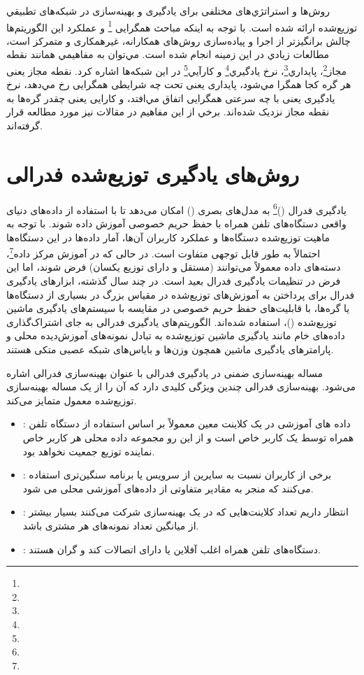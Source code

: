 روش‌ها و استراتژي‌های مختلفی برای یادگیری و بهینه‌سازی در شبکه‌های تطبيقي توزیع‌شده ارائه‌ شده است. با توجه به اينكه مباحث همگرایی \footnote{}  و عملکرد این الگوریتم‌ها چالش برانگیزتر از اجرا و پیاده‌سازی روش‌های همکارانه، غیرهمکاری و متمرکز است، مطالعات زيادي در اين زمينه انجام شده است. مي‌توان به مفاهيمي همانند نقطه مجاز\footnote{}، پايداري\footnote{}، نرخ يادگيري\footnote{} و كارآيي\footnote{}   در اين شبكه‌ها اشاره كرد.‌ نقطه مجاز یعنی هر گره کجا همگرا مي‌شود، پایداری یعنی تحت چه شرایطی همگرایی رخ مي‌دهد، نرخ یادگیری یعنی با چه سرعتی همگرایی اتفاق مي‌افتد، و کارایی یعنی چقدر گره‌ها به نقطه مجاز نزدیک شده‌اند. برخي از اين مفاهيم در مقالات \cite{Kha2012, Haj2018, Sayed2014} نيز مورد مطالعه قرار گرفته‌اند. 

\section{روش‌های یادگیری توزیع‌شده فدرالی}
یادگیری فدرال ()\footnote{} به مدل‌های بصری () امکان می‌دهد تا با استفاده از داده‌های دنیای واقعی دستگاه‌های تلفن همراه با حفظ حریم خصوصی آموزش داده شوند. با توجه به ماهیت توزیع‌شده دستگاه‌ها و عملکرد کاربران آن‌ها، آمار داده‌ها در این دستگاه‌ها احتمالاً به طور قابل توجهی متفاوت است. در حالی که در آموزش مرکز داده\footnote{}، دسته‌های داده معمولاً می‌توانند  (مستقل و دارای توزیع یکسان) فرض شوند، اما این فرض در تنظیمات یادگیری فدرال بعید است. در چند سال گذشته، ابزارهای یادگیری فدرال برای پرداختن به آموزش‌های توزیع‌شده در مقیاس بزرگ در بسیاری از دستگاه‌ها یا گره‌ها، با قابلیت‌های حفظ حریم خصوصی در مقایسه با سیستم‌های یادگیری ماشین توزیع‌شده ()، استفاده شده‌اند. الگوریتم‌های یادگیری فدرالی به جای اشتراک‌گذاری داده‌های خام مانند یادگیری ماشین توزیع‌شده به تبادل نمونه‌های آموزش‌دیده محلی و پارامترهای یادگیری ماشین همچون وزن‌ها و بایاس‌های شبکه‌ عصبی متکی هستند. 

مساله بهینه‌سازی ضمنی در یادگیری فدرالی با عنوان بهینه‌سازی فدرالی  اشاره می‌شود. بهینه‌سازی فدرالی چندین ویژگی کلیدی دارد که آن را از یک مساله بهینه‌سازی توزیع‌شده معمول متمایز می‌کند. 
\begin{itemize}
	\item 
	: داده های آموزشی در یک کلاینت معین معمولاً بر اساس استفاده از دستگاه تلفن همراه توسط یک کاربر خاص است و از این رو مجموعه داده محلی هر کاربر خاص نماینده توزیع جمعیت نخواهد بود.
	\item 
	: برخی از کاربران نسبت به سایرین از سرویس یا برنامه سنگین‌تری استفاده می‌کنند که منجر به مقادیر متفاوتی از داده‌های آموزشی محلی می شود.
	\item 
	: انتظار  داریم تعداد کلاینت‌هایی که در یک بهینه‌سازی شرکت می‌کنند بسیار بیشتر از میانگین تعداد نمونه‌های هر مشتری باشد.
	\item
	: دستگاه‌های تلفن همراه اغلب آفلاین یا دارای اتصالات کند و گران هستند.
\end{itemize}

